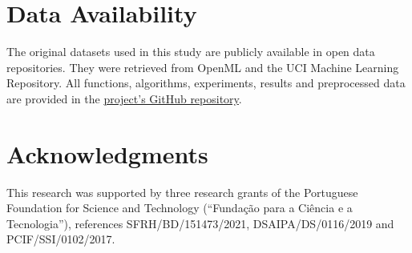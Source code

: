 \documentclass[parskip=full]{scrartcl}
\begin{document}
\section*{Data Availability}

The original datasets used in this study are publicly available in open data
repositories. They were retrieved from OpenML and the UCI Machine Learning
Repository. All functions, algorithms, experiments, results and preprocessed
data are provided in the
\href{https://github.com/joaopfonseca/publications}{project’s GitHub
repository}.

\section*{Acknowledgments}

This research was supported by three research grants of the Portuguese Foundation
for Science and Technology (``Fundação para a Ciência e a Tecnologia''),
references SFRH/BD/151473/2021, DSAIPA/DS/0116/2019 and PCIF/SSI/0102/2017.

\printbibliography%
\end{document}
